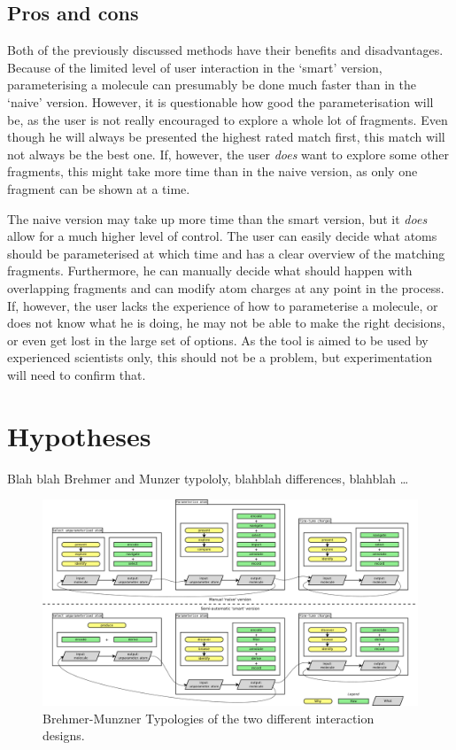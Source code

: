 \subsection{Pros and cons}
Both of the previously discussed methods have their benefits and disadvantages. Because of the limited level of user interaction in the `smart' version, parameterising a molecule can presumably be done much faster than in the `naive'  version. However, it is questionable how good the parameterisation will be, as the user is not really encouraged to explore a whole lot of fragments. Even though he will always be presented the highest rated match first, this match will not always be the best one. If, however, the user \emph{does} want to explore some other fragments, this might take more time than in the naive version, as only one fragment can be shown at a time.

The naive version may take up more time than the smart version, but it \emph{does} allow for a much higher level of control. The user can easily decide what atoms should be parameterised at which time and has a clear overview of the matching fragments. Furthermore, he can manually decide what should happen with overlapping fragments and can modify atom charges at any point in the process. If, however, the user lacks the experience of how to parameterise a molecule, or does not know what he is doing, he may not be able to make the right decisions, or even get lost in the large set of options. As the tool is aimed to be used by experienced scientists only, this should not be a problem, but experimentation will need to confirm that.


\section{Hypotheses}
Blah blah Brehmer and Munzer typololy, blahblah differences, blahblah \ldots

\begin{figure}
\begin{center}
\includegraphics[width=\textwidth]{img/complete_typology.pdf}
\caption{Brehmer-Munzner Typologies of the two different interaction designs.}
\end{center}
\end{figure}

